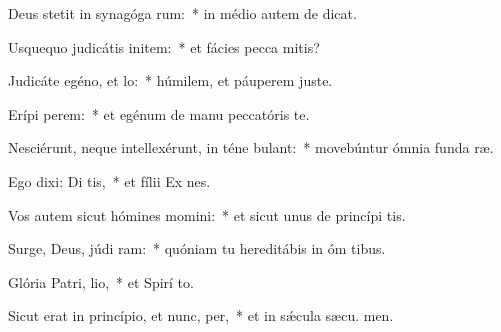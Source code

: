\item Deus stetit in synagóga rum:~* in médio autem de dicat.
\item Usquequo judicátis initem:~* et fácies pecca mitis?
\item Judicáte egéno, et lo:~* húmilem, et páuperem juste.
\item Erípi perem:~* et egénum de manu peccatóris te.
\item Nesciérunt, neque intellexérunt, in téne bulant:~* movebúntur ómnia funda ræ.
\item Ego dixi: Di tis,~* et fílii Ex nes.
\item Vos autem sicut hómines momini:~* et sicut unus de princípi tis.
\item Surge, Deus, júdi ram:~* quóniam tu hereditábis in óm tibus.
\item Glória Patri,  lio,~* et Spirí to.
\item Sicut erat in princípio, et nunc,  per,~* et in sǽcula sæcu. men.
